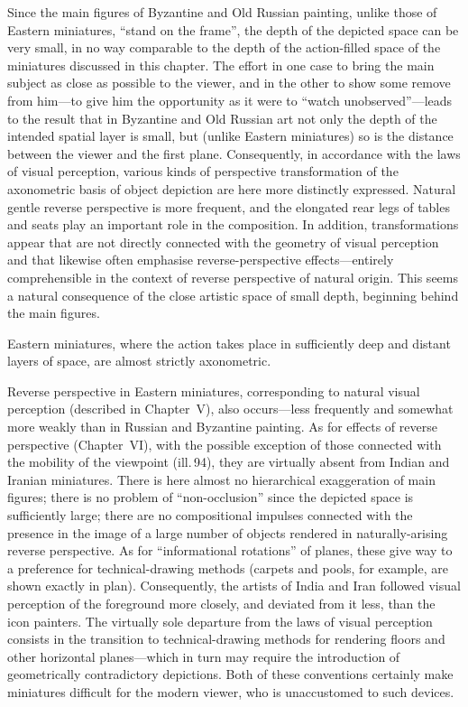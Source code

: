 Since the main figures of Byzantine and Old Russian painting, unlike those of
Eastern miniatures, ``stand on the frame'', the depth of the depicted space can be
very small, in no way comparable to the depth of the action-filled space of the
miniatures discussed in this chapter. The effort in one case to bring the main
subject as close as possible to the viewer, and in the other to show some remove
from him---to give him the opportunity as it were to ``watch unobserved''---leads
to the result that in Byzantine and Old Russian art not only the depth of the
intended spatial layer is small, but (unlike Eastern miniatures) so is the distance
between the viewer and the first plane. Consequently, in accordance with the laws
of visual perception, various kinds of perspective transformation of the axonometric
basis of object depiction are here more distinctly expressed. Natural gentle reverse
perspective is more frequent, and the elongated rear legs of tables and seats play
an important role in the composition. In addition, transformations appear that are
not directly connected with the geometry of visual perception and that likewise
often emphasise reverse-perspective effects---entirely comprehensible in the context
of reverse perspective of natural origin. This seems a natural consequence of the
close artistic space of small depth, beginning behind the main figures.

Eastern miniatures, where the action takes place in sufficiently deep and distant
layers of space, are almost strictly axonometric.

Reverse perspective in Eastern miniatures, corresponding to natural visual
perception (described in Chapter~V), also occurs---less frequently and somewhat more
weakly than in Russian and Byzantine painting. As for effects of reverse perspective
(Chapter~VI), with the possible exception of those connected with the mobility of
the viewpoint (ill.\,94), they are virtually absent from Indian and Iranian
miniatures. There is here almost no hierarchical exaggeration of main figures; there
is no problem of ``non-occlusion'' since the depicted space is sufficiently large;
there are no compositional impulses connected with the presence in the image of a
large number of objects rendered in naturally-arising reverse perspective. As for
``informational rotations'' of planes, these give way to a preference for
technical-drawing methods (carpets and pools, for example, are shown exactly in
plan). Consequently, the artists of India and Iran followed visual perception of the
foreground more closely, and deviated from it less, than the icon painters. The
virtually sole departure from the laws of visual perception consists in the
transition to technical-drawing methods for rendering floors and other horizontal
planes---which in turn may require the introduction of geometrically contradictory
depictions. Both of these conventions certainly make miniatures difficult for the
modern viewer, who is unaccustomed to such devices.

